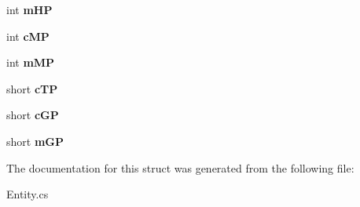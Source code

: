 \begin{DoxyCompactItemize}
\item 
\hypertarget{structffxivlib_1_1_entity_1_1_e_n_t_i_t_y_i_n_f_o_af2cbe0f7b155434b9995482b59a45992}{int {\bfseries m\-H\-P}}\label{structffxivlib_1_1_entity_1_1_e_n_t_i_t_y_i_n_f_o_af2cbe0f7b155434b9995482b59a45992}

\item 
\hypertarget{structffxivlib_1_1_entity_1_1_e_n_t_i_t_y_i_n_f_o_a81af69b94f15abeba9263682bd805ab5}{int {\bfseries c\-M\-P}}\label{structffxivlib_1_1_entity_1_1_e_n_t_i_t_y_i_n_f_o_a81af69b94f15abeba9263682bd805ab5}

\item 
\hypertarget{structffxivlib_1_1_entity_1_1_e_n_t_i_t_y_i_n_f_o_a3aad5eb2ed4ecff5e902cd054daf2d9b}{int {\bfseries m\-M\-P}}\label{structffxivlib_1_1_entity_1_1_e_n_t_i_t_y_i_n_f_o_a3aad5eb2ed4ecff5e902cd054daf2d9b}

\item 
\hypertarget{structffxivlib_1_1_entity_1_1_e_n_t_i_t_y_i_n_f_o_a680dced63aeb961d2d7ff24372f0b3df}{short {\bfseries c\-T\-P}}\label{structffxivlib_1_1_entity_1_1_e_n_t_i_t_y_i_n_f_o_a680dced63aeb961d2d7ff24372f0b3df}

\item 
\hypertarget{structffxivlib_1_1_entity_1_1_e_n_t_i_t_y_i_n_f_o_a905fc67478130ba6433fe2b9b4d0ddec}{short {\bfseries c\-G\-P}}\label{structffxivlib_1_1_entity_1_1_e_n_t_i_t_y_i_n_f_o_a905fc67478130ba6433fe2b9b4d0ddec}

\item 
\hypertarget{structffxivlib_1_1_entity_1_1_e_n_t_i_t_y_i_n_f_o_a27e352e8bc836e304bf2e894bb5e8763}{short {\bfseries m\-G\-P}}\label{structffxivlib_1_1_entity_1_1_e_n_t_i_t_y_i_n_f_o_a27e352e8bc836e304bf2e894bb5e8763}

\end{DoxyCompactItemize}


The documentation for this struct was generated from the following file\-:\begin{DoxyCompactItemize}
\item 
Entity.\-cs\end{DoxyCompactItemize}
